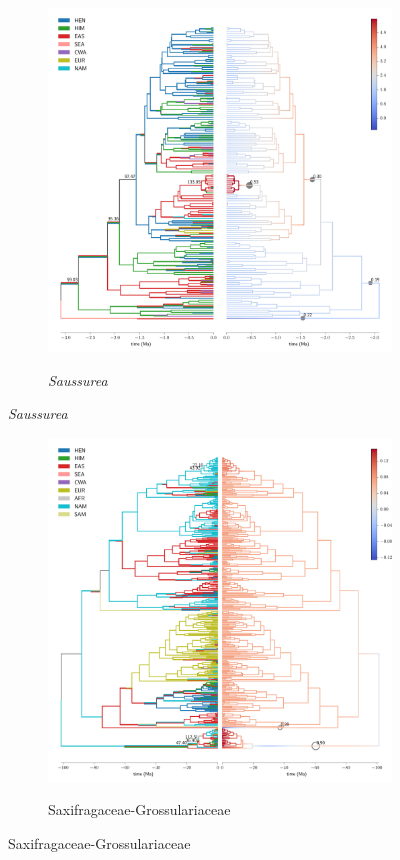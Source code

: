 \begin{figure}
  \ContinuedFloat
\begin{subfigure}{\textwidth}
\centering
\includegraphics[width=.99\linewidth]{figures/Saussurea-supfig.pdf}
\label{fig:allium}
\caption{\textit{Saussurea}}
\end{subfigure}
\end{figure}

\begin{figure}
  \ContinuedFloat
\begin{subfigure}{\textwidth}
\centering
\includegraphics[width=.99\linewidth]{figures/Saxifragaceae-supfig.pdf}
\label{fig:allium}
\caption{Saxifragaceae-Grossulariaceae}
\end{subfigure}
\end{figure}

